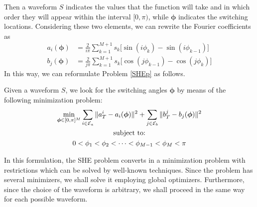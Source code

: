 Then a waveform $S$ indicates the values that the function will take and in which order they will appear within the interval $[0,\pi) $, while $\bm{\phi}$ indicates the switching locations. Considering these two elements, we can rewrite the Fourier coefficients as
\begin{equation}
    \begin{aligned}
        a_i(\bm{\phi}) & =  \frac{2}{i\pi} \sum_{k=1}^{M+1} s_k \Big[\sin(i\phi_k) -\sin(i\phi_{k-1})\Big]
        \\
        b_j(\bm{\phi}) & = \frac{2}{j\pi} \sum_{k=1}^{M+1} s_k \Big[\cos(j\phi_{k-1}) -\cos(j\phi_{k})\Big]
    \end{aligned}
\end{equation}
In this way, we can reformulate Problem \ref{SHEp} as follows.
\newline
\begin{problem}
Given a waveform $S$, we look for the switching angles $\bm{\phi}$ by means of the following minimization problem:
    \begin{gather}
        \min_{\bm{\phi} \in [0,\pi]^{M}} \sum_{i\in\mathcal{E}_a} \|a_T^i - a_i(\bm{\phi})\|^2 + \sum_{j\in \mathcal{E}_b} \|b_T^j - b_j(\bm{\phi})\|^2 
        \\
        \notag \text{subject to:}
        \\
        \notag 0 <\phi_1 < \phi_2 < \dots < \phi_{M-1} < \phi_{M} < \pi 
    \end{gather}
\end{problem}
In this formulation, the SHE problem converts in a minimization problem with restrictions which can be solved by well-known techniques. Since the problem has several minimizers, we shall solve it employing global optimizers. Furthermore, since the choice of the waveform is arbitrary, we shall proceed in the same way for each possible waveform. 